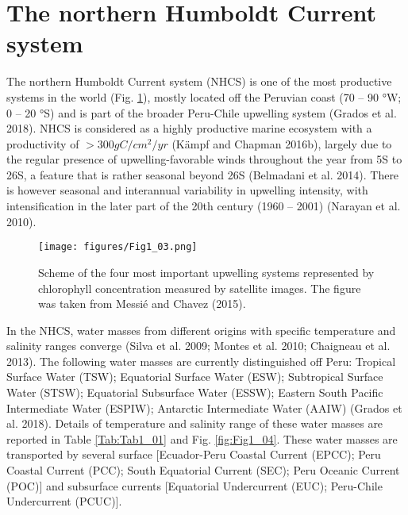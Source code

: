 \section{The northern Humboldt Current system}
The northern Humboldt Current system (NHCS) is one of the most productive systems in the world (Fig. \ref{fig:Fig1_03}), mostly located off the Peruvian coast (70 – 90 °W; 0 – 20 °S) and is part of the broader Peru-Chile upwelling system \citep{GradChai2018}(Grados et al. 2018). NHCS is considered as a highly productive marine ecosystem with a productivity of $>300 g C/cm^{2}/yr$ \citep{KampCap5}(Kämpf and Chapman 2016b), largely due to the regular presence of upwelling-favorable winds throughout the year from 5\textdegree S to 26\textdegree S, a feature that is rather seasonal beyond 26\textdegree S \citep{Belm2014}(Belmadani et al. 2014). There is however seasonal and interannual variability in upwelling intensity, with intensification in the later part of the 20th century (1960 – 2001) \citep{Nara2010}(Narayan et al. 2010).\\

\begin{figure}[ht]
	\texttt{[image: figures/Fig1\_03.png]}
	\centering
	\caption{Scheme of the four most important upwelling systems represented by chlorophyll concentration measured by satellite images. The figure was taken from Messié and Chavez (2015).}
	\label{fig:Fig1_03}
\end{figure}

In the NHCS, water masses from different origins with specific temperature and salinity ranges converge \citep{SilvRoja2009,MontCola2010,ChaiDomi2013}(Silva et al. 2009; Montes et al. 2010; Chaigneau et al. 2013). The following water masses are currently distinguished off Peru: Tropical Surface Water (TSW); Equatorial Surface Water (ESW); Subtropical Surface Water (STSW); Equatorial Subsurface Water (ESSW); Eastern South Pacific Intermediate Water (ESPIW); Antarctic Intermediate Water (AAIW) \citep{GradChai2018}(Grados et al. 2018). Details of temperature and salinity range of these water masses are reported in Table \ref{Tab:Tab1_01} and Fig. \ref{fig:Fig1_04}. These water masses are transported by several surface [Ecuador-Peru Coastal Current (EPCC); Peru Coastal Current (PCC); South Equatorial Current (SEC); Peru Oceanic Current (POC)] and subsurface currents [Equatorial Undercurrent (EUC); Peru-Chile Undercurrent (PCUC)].\\


